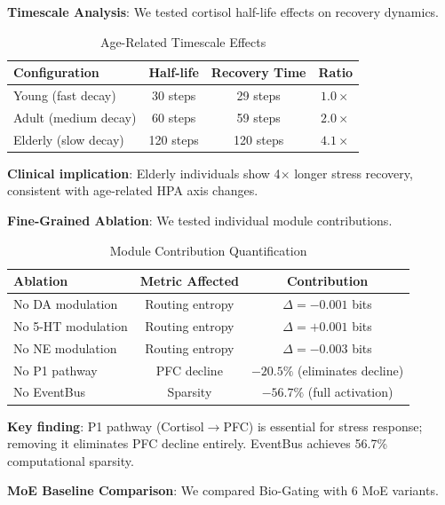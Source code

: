 \documentclass[preprint,12pt]{elsarticle}
\begin{document}
\textbf{Timescale Analysis}: We tested cortisol half-life effects on recovery dynamics.

\begin{table}[htbp]
\centering
\caption{Age-Related Timescale Effects}
\label{tab:timescale}
\begin{tabular}{lccc}
\toprule
\textbf{Configuration} & \textbf{Half-life} & \textbf{Recovery Time} & \textbf{Ratio} \\
\midrule
Young (fast decay) & 30 steps & 29 steps & $1.0\times$ \\
Adult (medium decay) & 60 steps & 59 steps & $2.0\times$ \\
Elderly (slow decay) & 120 steps & 120 steps & $4.1\times$ \\
\bottomrule
\end{tabular}
\end{table}

\textbf{Clinical implication}: Elderly individuals show 4$\times$ longer stress recovery, consistent with age-related HPA axis changes.

\textbf{Fine-Grained Ablation}: We tested individual module contributions.

\begin{table}[htbp]
\centering
\caption{Module Contribution Quantification}
\label{tab:fine_ablation}
\begin{tabular}{lcc}
\toprule
\textbf{Ablation} & \textbf{Metric Affected} & \textbf{Contribution} \\
\midrule
No DA modulation & Routing entropy & $\Delta = -0.001$ bits \\
No 5-HT modulation & Routing entropy & $\Delta = +0.001$ bits \\
No NE modulation & Routing entropy & $\Delta = -0.003$ bits \\
No P1 pathway & PFC decline & $-20.5\%$ (eliminates decline) \\
No EventBus & Sparsity & $-56.7\%$ (full activation) \\
\bottomrule
\end{tabular}
\end{table}

\textbf{Key finding}: P1 pathway (Cortisol$\rightarrow$PFC) is essential for stress response; removing it eliminates PFC decline entirely. EventBus achieves 56.7\% computational sparsity.

\textbf{MoE Baseline Comparison}: We compared Bio-Gating with 6 MoE variants.
\end{document}
